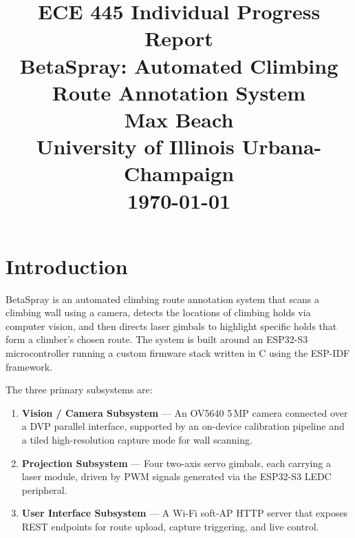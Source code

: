 \documentclass[12pt]{article}
\title{
  \textbf{ECE 445 Individual Progress Report} \\
  \large BetaSpray: Automated Climbing Route Annotation System \\[0.5em]
  \normalsize Max Beach \\
  University of Illinois Urbana-Champaign \\
  \today
}
\date{}
\begin{document}
\maketitle
\thispagestyle{fancy}

\tableofcontents
\newpage

\section{Introduction}

BetaSpray is an automated climbing route annotation system that scans a climbing
wall using a camera, detects the locations of climbing holds via computer vision,
and then directs laser gimbals to highlight specific holds that form a climber's
chosen route.  The system is built around an ESP32-S3 microcontroller running a
custom firmware stack written in C using the ESP-IDF framework.

The three primary subsystems are:
\begin{enumerate}
  \item \textbf{Vision / Camera Subsystem} --- An OV5640 5\,MP camera connected
        over a DVP parallel interface, supported by an on-device calibration
        pipeline and a tiled high-resolution capture mode for wall scanning.
  \item \textbf{Projection Subsystem} --- Four two-axis servo gimbals, each
        carrying a laser module, driven by PWM signals generated via the ESP32-S3
        LEDC peripheral.
  \item \textbf{User Interface Subsystem} --- A Wi-Fi soft-AP HTTP server that
        exposes REST endpoints for route upload, capture triggering, and live
        control.
\end{enumerate}
\end{document}

